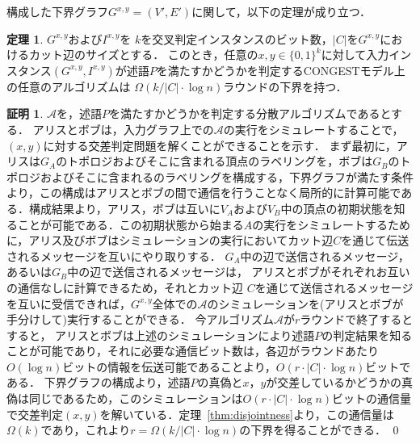\documentclass[12pt]{thesis}
\newcommand{\CONGEST}{\textsf{CONGEST}}
\theoremstyle{definition}
\newtheorem{theorem}{定理}[chapter]
\newtheorem*{prf*}{証明}
\begin{document}
構成した下界グラフ$G^{x, y} = (V', E')$に関して，以下の定理が成り立つ．
\begin{theorem}
$G^{x,y}$および$I^{x,y}$を
$k$を交叉判定インスタンスのビット数，$|C|$を$G^{x, y}$におけるカット辺のサイズとする．
このとき，任意の$x, y \in \{0, 1\}^k$に対して入力インスタンス$(G^{x, y}, I^{x,y})$が述語$P$を満たすかどうかを判定する{\CONGEST}モデル上の任意のアルゴリズムは
$\Omega (k / |C| \cdot \log n)$ラウンドの下界を持つ．
\label{lower}
\end{theorem}
\begin{prf*}
$\mathcal{A}$を，述語$P$を満たすかどうかを判定する分散アルゴリズムであるとする．
アリスとボブは，入力グラフ上での$\mathcal{A}$の実行をシミュレートすることで，
$(x, y)$に対する交差判定問題を解くことができることを示す．
まず最初に，アリスは$G_{A}$のトポロジおよびそこに含まれる頂点のラベリングを，ボブは$G_{B}$のトポロジおよびそこに含まれるのラベリングを構成する，下界グラフが満たす条件より，この構成はアリスとボブの間で通信を行うことなく局所的に計算可能である．構成結果より，アリス，ボブは互いに$V_A$および$V_B$中の頂点の初期状態を知ることが可能である．この初期状態から始まる$A$の実行をシミュレートするために，アリス及びボブはシミュレーションの実行においてカット辺$C$を通じて伝送されるメッセージを互いにやり取りする．
$G_{A}$中の辺で送信されるメッセージ，あるいは$G_{B}$中の辺で送信されるメッセージは，
アリスとボブがそれぞれお互いの通信なしに計算できるため，それとカット辺
$C$を通じて送信されるメッセージを互いに受信できれば，$G^{x,y}$全体での$\mathcal{A}$のシミュレーションを(アリスとボブが手分けして)実行することができる．
今アルゴリズム$\mathcal{A}$が$r$ラウンドで終了するとすると，
アリスとボブは上述のシミュレーションにより述語$P$の判定結果を知ることが可能であり，それに必要な通信ビット数は，各辺がラウンドあたり$O(\log n)$ビットの情報を伝送可能であることより，$O(r \cdot |C| \cdot \log n)$ビットである．
下界グラフの構成より，述語$P$の真偽と$x$，$y$が交差しているかどうかの真偽は同じであるため，このシミュレーションは$O(r \cdot |C| \cdot \log n)$ビットの通信量で交差判定$(x,y)$を解いている．定理~\ref{thm:disjointness}より，この通信量は$\Omega(k)$であり，これより$r = \Omega (k / |C| \cdot \log n)$の下界を得ることができる．
\qed
\end{prf*}
\end{document}

